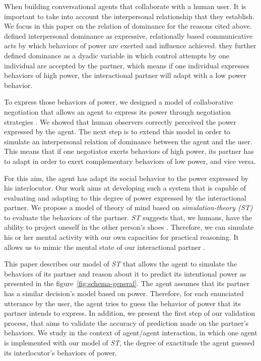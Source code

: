 \documentclass[conference, letterpaper]{IEEEtran}
\begin{document}
		When building conversational agents that collaborate with a human user. It is important  to take into account the interpersonal relationship that they establish. We focus in this paper on the relation of dominance for the reasons cited above. \cite{burgoon1998nature} defined interpersonal dominance as expressive, relationally based communicative acts by which behaviors of power are exerted and influence achieved. they further defined dominance as a dyadic variable in which control attempts by one individual are accepted by the partner, which means if one individual expresses behaviors of high power, the interactional partner will adapt with a low power behavior. 
	
		To express those behaviors of power, we designed a model of collaborative negotiation that allows an agent to express its power through negotiation strategies \cite{ouali2017computational}. We showed that human observers correctly perceived the power expressed by the agent.
		The next step is to extend this model in order to simulate an interpersonal relation of dominance between the agent and the user. This means that if one negotiator exerts behaviors of high power, its partner has to adapt in order to exert complementary behaviors of low power, and vice versa.
		
		 For this aim, the agent has adapt its social behavior to the power expressed by his interlocutor. Our work aims at developing such a system that is capable of evaluating and adapting to this degree of power expressed by the interactional partner. We propose a model of theory of mind based on \emph{simulation-theory (ST)} \cite{gordon1986folk} to evaluate the behaviors of the partner. \emph{ST} suggests that, we humans, have the ability to project oneself in the other person’s shoes \cite{shanton2010simulation}. Therefore, we can simulate his or her mental activity with our own capacities for practical reasoning. It allows us to mimic the mental state of our interactional partner \cite{harbers2009modeling}.%
		  
		 This paper describes our model of \emph{ST} that allows the agent to simulate the behaviors of its partner and reason about it to predict its intentional power as presented in the figure~\ref{fig:schema-general}. The agent assumes that its partner has a similar decision's model based on power. Therefore, for each enunciated utterance by the user, the agent tries to guess the behavior of power that its partner intends to express. In addition, we present the first step of our validation process, that aims to validate the accuracy of prediction made on the partner's behaviors. We study in the context of agent/agent interaction, in which one agent is implemented with our model of \emph{ST}, the degree of exactitude the agent guessed its interlocutor's behaviors of power. 
		 
\end{document}
